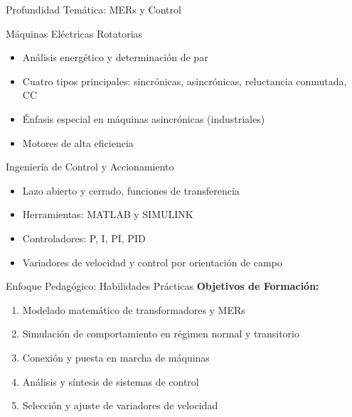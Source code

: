 \documentclass[aspectratio=43]{beamer}
\begin{document}
  \begin{frame}{Profundidad Temática: MERs y Control}
  \begin{block}{Máquinas Eléctricas Rotatorias}
  \begin{itemize}
    \small
  \item Análisis energético y determinación de par
  \item Cuatro tipos principales: sincrónicas, asincrónicas, reluctancia conmutada, CC
  \item Énfasis especial en máquinas asincrónicas (industriales)
  \item Motores de alta eficiencia
  \end{itemize}
  \end{block}
  
  \begin{block}{Ingeniería de Control y Accionamiento}
  \begin{itemize}
    \small
  \item Lazo abierto y cerrado, funciones de transferencia
  \item Herramientas: MATLAB y SIMULINK
  \item Controladores: P, I, PI, PID
  \item Variadores de velocidad y control por orientación de campo
  \end{itemize}
  \end{block}
  
  \end{frame}
  
  \begin{frame}{Enfoque Pedagógico: Habilidades Prácticas}
  \textbf{Objetivos de Formación:}
  \begin{enumerate}
  \item Modelado matemático de transformadores y MERs
  \item Simulación de comportamiento en régimen normal y transitorio
  \item Conexión y puesta en marcha de máquinas
  \item Análisis y síntesis de sistemas de control
  \item Selección y ajuste de variadores de velocidad
  \end{enumerate}
  
  \end{frame}
  
\end{document}

